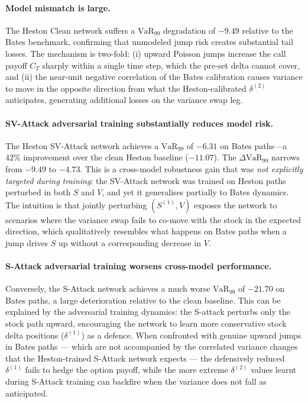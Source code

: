 \paragraph{Model mismatch is large.}
The Heston Clean network suffers a $\mathrm{VaR}_{99}$ degradation of
$-9.49$ relative to the Bates benchmark, confirming that unmodeled jump
risk creates substantial tail losses.  The mechanism is two-fold: (i)
upward Poisson jumps increase the call payoff $C_T$ sharply within a
single time step, which the pre-set delta cannot cover, and (ii) the
near-unit negative correlation of the Bates calibration causes variance
to move in the opposite direction from what the Heston-calibrated
$\delta^{(2)}$ anticipates, generating additional losses on the variance
swap leg.

\paragraph{SV-Attack adversarial training substantially reduces model risk.}
The Heston SV-Attack network achieves a $\mathrm{VaR}_{99}$ of $-6.31$
on Bates paths---a $42\%$ improvement over the clean Heston baseline
($-11.07$).  The $\Delta\mathrm{VaR}_{99}$ narrows from $-9.49$ to
$-4.73$.  This is a cross-model robustness gain that was \emph{not
explicitly targeted during training}: the SV-Attack network was trained
on Heston paths perturbed in both $S$ and $V$, and yet it generalises
partially to Bates dynamics.  The intuition is that jointly perturbing
$(S^{(1)}, V)$ exposes the network to scenarios where the variance swap
fails to co-move with the stock in the expected direction, which
qualitatively resembles what happens on Bates paths when a jump drives
$S$ up without a corresponding decrease in $V$.

\paragraph{S-Attack adversarial training worsens cross-model performance.}
Conversely, the S-Attack network achieves a much worse $\mathrm{VaR}_{99}$
of $-21.70$ on Bates paths, a large deterioration relative to the clean
baseline.  This can be explained by the adversarial training dynamics:
the S-attack perturbs only the stock path upward, encouraging the
network to learn more conservative stock delta positions ($\delta^{(1)}$)
as a defence.  When confronted with genuine upward jumps in Bates paths
--- which are not accompanied by the correlated variance changes that the
Heston-trained S-Attack network expects --- the defensively reduced
$\delta^{(1)}$ fails to hedge the option payoff, while the more extreme
$\delta^{(2)}$ values learnt during S-Attack training can backfire when
the variance does not fall as anticipated.

